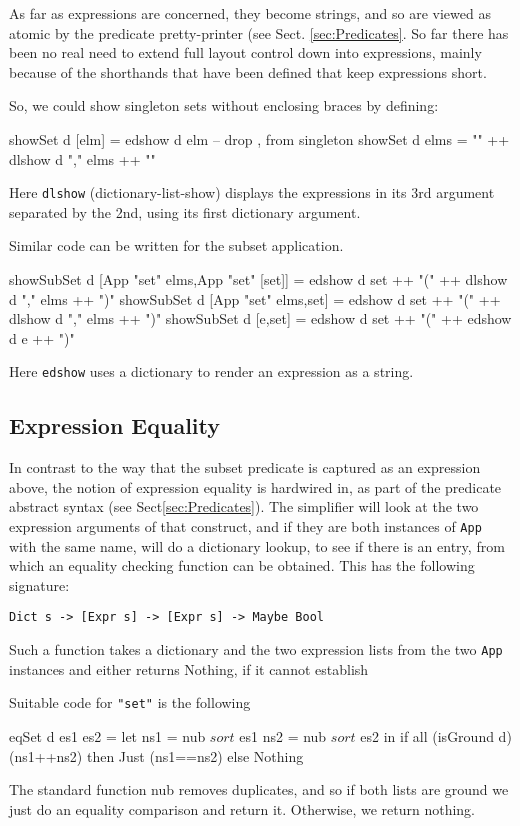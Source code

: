 As far as expressions are concerned,
they become strings, and so are viewed as atomic
by the predicate pretty-printer (see Sect. \ref{sec:Predicates}.
So far there has been no real need to extend full layout control
down into expressions,
mainly because of the shorthands that have been defined
that keep expressions short.

So, we could show singleton sets without enclosing braces
by defining:
\begin{code}
showSet d [elm] = edshow d elm      -- drop {,} from singleton
showSet d elms = "{" ++ dlshow d "," elms ++ "}"
\end{code}
Here \texttt{dlshow} (dictionary-list-show) displays the expressions
in its 3rd argument separated by the 2nd,
using its first dictionary argument.

Similar code can be written for the subset application.
\begin{code}
showSubSet d [App "set" elms,App "set" [set]]
 = edshow d set ++ "(" ++ dlshow d "," elms ++ ")"
showSubSet d [App "set" elms,set]
 = edshow d set ++ "(" ++ dlshow d "," elms ++ ")"
showSubSet d [e,set]
 = edshow d set ++ "(" ++ edshow d e ++ ")"
\end{code}
Here \texttt{edshow} uses a dictionary to render an expression as a string.

\subsection{Expression Equality}

In contrast to the way that the subset predicate
is captured as an expression above,
the notion of expression equality is hardwired in,
as part of the predicate abstract syntax (see Sect\ref{sec:Predicates}).
The simplifier will look at the two expression
arguments of that construct,
and if they are both instances of \texttt{App} with the same name,
will do a dictionary lookup, to see if there
is an entry, from
which an equality checking function can be obtained.
This has the following signature:
\begin{verbatim}
Dict s -> [Expr s] -> [Expr s] -> Maybe Bool
\end{verbatim}
Such a function takes a dictionary and the two expression
lists from the two \texttt{App} instances
and either returns Nothing, if it cannot establish 

Suitable code for \verb$"set"$ is the following
\begin{code}
eqSet d es1 es2
 = let ns1 = nub $ sort $ es1
       ns2 = nub $ sort $ es2
   in if all (isGround d) (ns1++ns2)
      then Just (ns1==ns2)
      else Nothing
\end{code}
The standard function nub removes duplicates,
and so if both lists are ground we just do an equality comparison
and return it. Otherwise, we return nothing.


